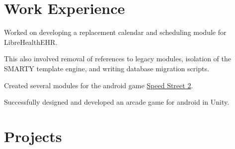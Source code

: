 \documentclass[a4paper]{resume}
\begin{document}
\begin{minipage}[t]{0.66\textwidth} %


\section{Work Experience}


\vspace{\topsep} %
\begin{tightitemize}
\item Worked on developing a replacement calendar and scheduling module for LibreHealthEHR.
\item  This also involved removal of references to legacy modules, isolation of the SMARTY template engine, and writing database migration scripts.
\end{tightitemize}

\sectionspace %



\begin{tightitemize}
\item Created several modules for the android game {\href{https://play.google.com/store/apps/details?id=com.firexit.speedstreet2VRdemo}{Speed Street 2}}.
\item Successfully designed and developed an arcade game for android in Unity.
\end{tightitemize}

\sectionspace %


\section{Projects}




\end{minipage}
\end{document}
